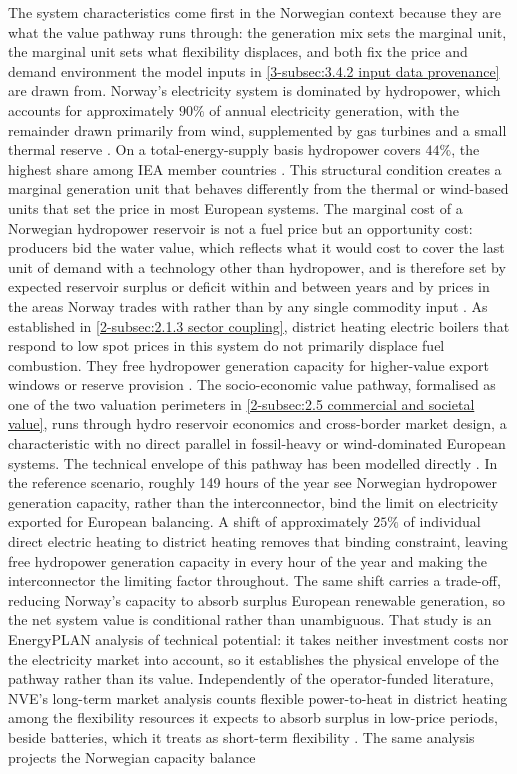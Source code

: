 The system characteristics come first in the Norwegian context because they are what the value pathway runs through: the generation mix sets the marginal unit, the marginal unit sets what flexibility displaces, and both fix the price and demand environment the model inputs in \autoref{3-subsec:3.4.2 input data provenance} are drawn from. Norway's electricity system is dominated by hydropower, which accounts for approximately $90\%$ of annual electricity generation, with the remainder drawn primarily from wind, supplemented by gas turbines and a small thermal reserve \cite{NVE_langsiktig_2023, iea_-_international_energy_agency_norway_2022}. On a total-energy-supply basis hydropower covers $44\%$, the highest share among IEA member countries \cite{iea_-_international_energy_agency_norway_2022}. This structural condition creates a marginal generation unit that behaves differently from the thermal or wind-based units that set the price in most European systems. The marginal cost of a Norwegian hydropower reservoir is not a fuel price but an opportunity cost: producers bid the water value, which reflects what it would cost to cover the last unit of demand with a technology other than hydropower, and is therefore set by expected reservoir surplus or deficit within and between years and by prices in the areas Norway trades with rather than by any single commodity input \cite{multiconsult_drivere_2022}. As established in \autoref{2-subsec:2.1.3 sector coupling}, district heating electric boilers that respond to low spot prices in this system do not primarily displace fuel combustion. They free hydropower generation capacity for higher-value export windows or reserve provision \cite{askeland_balancing_2019}. The socio-economic value pathway, formalised as one of the two valuation perimeters in \autoref{2-subsec:2.5 commercial and societal value}, runs through hydro reservoir economics and cross-border market design, a characteristic with no direct parallel in fossil-heavy or wind-dominated European systems. The technical envelope of this pathway has been modelled directly \cite{askeland_balancing_2019}. In the reference scenario, roughly 149 hours of the year see Norwegian hydropower generation capacity, rather than the interconnector, bind the limit on electricity exported for European balancing. A shift of approximately $25\%$ of individual direct electric heating to district heating removes that binding constraint, leaving free hydropower generation capacity in every hour of the year and making the interconnector the limiting factor throughout. The same shift carries a trade-off, reducing Norway's capacity to absorb surplus European renewable generation, so the net system value is conditional rather than unambiguous. That study is an EnergyPLAN analysis of technical potential: it takes neither investment costs nor the electricity market into account, so it establishes the physical envelope of the pathway rather than its value. Independently of the operator-funded literature, NVE's long-term market analysis counts flexible power-to-heat in district heating among the flexibility resources it expects to absorb surplus in low-price periods, beside batteries, which it treats as short-term flexibility \cite{NVE_langsiktig_2023}. The same analysis projects the Norwegian capacity balance 